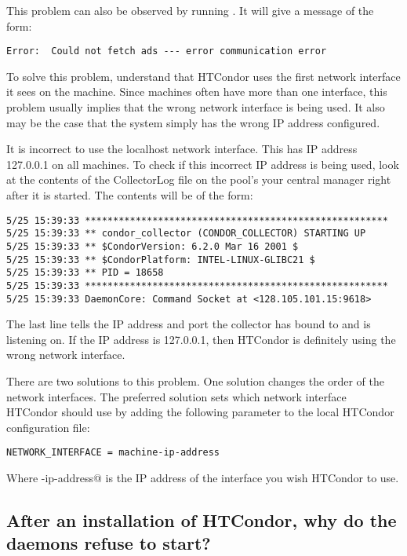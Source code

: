 This problem can also be observed by running .
It will give a message of the form:
\footnotesize
\begin{verbatim}
Error:  Could not fetch ads --- error communication error
\end{verbatim}
\normalsize

To solve this problem, understand that
HTCondor uses the first network interface it sees on the machine.
Since machines often have more than one interface,
this problem usually implies that the wrong network
interface is being used.  It also may be the case that
the system simply has the wrong IP address configured.

It is incorrect to use the localhost network interface.
This has IP address 127.0.0.1 on all machines.
To check if this incorrect IP address is being used,
look at the contents of the
CollectorLog file on the pool's
your central manager right after it is started.  
The contents will be of the form:

\footnotesize
\begin{verbatim}
5/25 15:39:33 ******************************************************
5/25 15:39:33 ** condor_collector (CONDOR_COLLECTOR) STARTING UP
5/25 15:39:33 ** $CondorVersion: 6.2.0 Mar 16 2001 $
5/25 15:39:33 ** $CondorPlatform: INTEL-LINUX-GLIBC21 $
5/25 15:39:33 ** PID = 18658
5/25 15:39:33 ******************************************************
5/25 15:39:33 DaemonCore: Command Socket at <128.105.101.15:9618>
\end{verbatim}
\normalsize

The last line tells the IP address and port the collector has
bound to and is listening on.
If the IP address is 127.0.0.1, then HTCondor is definitely using the wrong
network interface.

There are two solutions to this problem.
One solution changes the order of the network interfaces.
The preferred solution
sets which network interface HTCondor should use
by adding the following parameter to the
local HTCondor configuration file:

\begin{verbatim}
NETWORK_INTERFACE = machine-ip-address
\end{verbatim}

Where \verb@machine-ip-address@ is the IP address of the interface you wish
HTCondor to use.

\subsection*{After an installation of HTCondor, why do the daemons refuse to start?}

